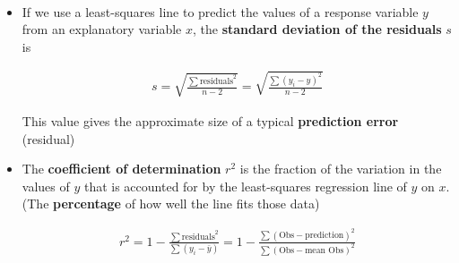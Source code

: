 \documentclass[Main.tex]{subfiles}
\begin{document}
	\begin{exercise} \hfill \\
		\begin{itemize}	
			\item If we use a least-squares line to predict the values of a response variable $y$ from an explanatory variable $x$, the \textbf{standard deviation of the residuals} $s$ is
			
			\begin{definition}
				\begin{subequations}
					\begin{align}
						s=\sqrt{\frac{\sum\text{residuals}^{2}}{n-2}}=\sqrt{\frac{\sum(y_{i}-\hat{y})^{2}}{n-2}}
					\end{align}
				\end{subequations}
			\end{definition} \hfill
			
			This value gives the approximate size of a typical \textbf{prediction error} (residual)\\
			
			\item The \textbf{coefficient of determination} $r^{2}$ is the fraction of the variation in the values of $y$ that is accounted for by the least-squares regression line of $y$ on $x$.\hfill \\
			(The \textbf{percentage} of how well the line fits those data)
			
			\begin{definition}
				\begin{subequations}
					\begin{align}
						r^{2}=1-\frac{\sum\text{residuals}^{2}}{\sum(y_{i}-\bar{y})}=1-\frac{\sum(\text{Obs$-$prediction})^{2}}{\sum(\text{Obs$-$mean Obs})^{2}}
					\end{align}
				\end{subequations}
			\end{definition} \hfill						
		\end{itemize}
	\end{exercise}
	
\end{document}

